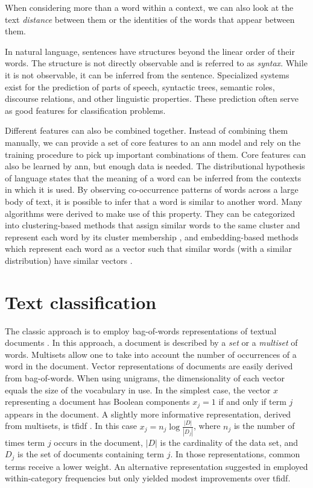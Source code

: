 When considering more than a word within a context, we can also look
at the text \emph{distance} between them or the identities of the
words that appear between them.

In natural language, sentences have structures beyond the linear order
of their words. The structure is not directly observable and is
referred to as \emph{syntax}. While it is not observable, it can be
inferred from the sentence. Specialized systems exist for the
prediction of parts of speech, syntactic trees, semantic roles,
discourse relations, and other linguistic properties. These prediction
often serve as good features for classification problems.

Different features can also be combined together. Instead of combining
them manually, we can provide a set of core features to an \ac{ann}
model and rely on the training procedure to pick up important
combinations of them.
Core features can also be learned by \ac{ann}, but enough data is
needed. The distributional hypothesis of language states that the
meaning of a word can be inferred from the contexts in which it is
used. By observing co-occurrence patterns of words across a large body
of text, it is possible to infer that a word is similar to another
word. Many algorithms were derived to make use of this property. They
can be categorized into clustering-based methods that assign similar
words to the same cluster and represent each word by its cluster
membership \cite{miller2004name}, and embedding-based methods which
represent each word as a 
vector such that similar words (with a similar distribution) have
similar vectors \cite{pennington_glove:_2014,mikolov_linguistic_2013}.

\section{Text classification}
\label{sec-baselines}
The classic approach is to employ bag-of-words
representations of textual documents
\cite{manning_introduction_2008}. In this approach, a document is 
described by a \textit{set} or a \textit{multiset} of words.
Multisets allow one to take into account the number of occurrences of
a word in the document. Vector representations of documents are easily
derived from bag-of-words. When using unigrams, the dimensionality of
each vector equals the size of the vocabulary in use. In the simplest
case, the vector $x$ representing a document has Boolean components
$x_j=1$ if and only if term $j$ appears in the document. A slightly more
informative representation, derived from multisets, is \ac{tfidf}
\cite{manning_introduction_2008}. In this case 
$x_j=n_j\log \frac{|D|}{|D_j|}$, where $n_j$ is the number of times
term $j$ occurs in the document, $|D|$ is the cardinality of the
data set, and $D_j$ is the set of documents containing term $j$. In
those representations, common terms receive a lower weight. An
alternative representation suggested in
\cite{martinez_information_2011} employed within-category frequencies
but only yielded modest improvements over \ac{tfidf}.

